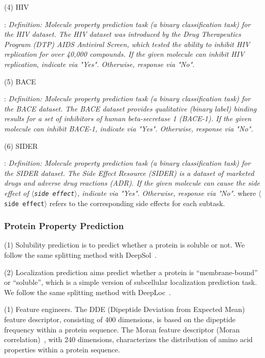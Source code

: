 \documentclass[11pt]{article}
\begin{document}
\noindent(4) HIV

:
\textit{Definition: Molecule property prediction task (a binary classification task) for the HIV dataset. The HIV dataset was introduced by the Drug Therapeutics Program (DTP) AIDS Antiviral Screen, which tested the ability to inhibit HIV replication for over 40,000 compounds. If the given molecule can inhibit HIV replication, indicate via "Yes". Otherwise, response via "No".}

\noindent(5) BACE

:
\textit{Definition: Molecule property prediction task (a binary classification task) for the BACE dataset. The BACE dataset provides qualitative (binary label) binding results for a set of inhibitors of human beta-secretase 1 (BACE-1). If the given molecule can inhibit BACE-1, indicate via "Yes". Otherwise, response via "No".}

\noindent(6) SIDER

:
\textit{Definition: Molecule property prediction task (a binary classification task) for the SIDER dataset. The Side Effect Resource (SIDER) is a dataset of marketed drugs and adverse drug reactions (ADR). If the given molecule can cause the side effect of $\langle$\texttt{side effect}$\rangle$, indicate via "Yes". Otherwise, response via "No".} where $\langle$\texttt{side effect}$\rangle$ refers to the corresponding side effects for each subtask.

\subsubsection{Protein Property Prediction}
\label{sec:protein_property_detail}

\noindent(1) Solubility prediction is to predict whether a protein is soluble or not. We follow the same splitting method with DeepSol~\citep{DBLP:journals/bioinformatics/KhuranaRKCBM18}.

\noindent(2) Localization prediction aims predict whether a protein is ``membrane-bound'' or ``soluble'', which is a simple version of subcellular localization prediction task. We follow the same splitting method with DeepLoc~\citep{DBLP:journals/bioinformatics/ArmenterosSSNW17}.



\noindent(1) Feature engineers. The DDE (Dipeptide Deviation from Expected Mean)~\citep{saravanan2015harnessing} feature descriptor, consisting of 400 dimensions, is based on the dipeptide frequency within a protein sequence.
The Moran feature descriptor (Moran correlation)~\citep{feng2000prediction}, with 240 dimensions, characterizes the distribution of amino acid properties within a protein sequence. 
\end{document}
